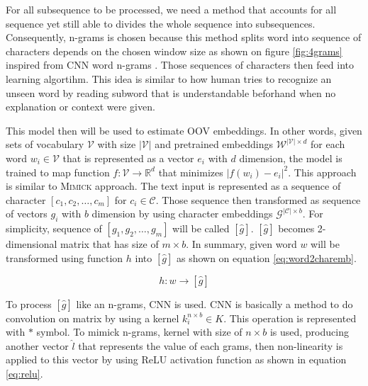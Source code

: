         For all subsequence to be processed, we need a method that
        accounts for all sequence yet still able to divides the whole
        sequence into subsequences. Consequently, n-grams is chosen
        because this method splits word into sequence of characters
        depends on the chosen window size as shown on figure
        \ref{fig:4grams} inspired from CNN word n-grams
        \citep{convolutional2014kim}. Those sequences of characters
        then feed into learning algortihm. This idea is similar to how
        human tries to recognize an unseen word by reading subword
        that is understandable beforhand when no explanation or
        context were given. 

        This model then will be used to estimate OOV embeddings. In
        other words, given sets of vocabulary $\mathcal{V}$ with size
        $\vert\mathcal{V}\vert$ and pretrained embeddings
        $\mathcal{W}^{\vert\mathcal{V}\vert \times d}$ for each word
        $w_{i} \in \mathcal{V}$ that is represented as a vector $e_i$
        with $d$ dimension, the model is trained to map function
        $f:\mathcal{V} \rightarrow \mathbb{R}^d$ that minimizes $\vert
        f(w_i) - e_i
        \vert^{2}$. This approach is similar to \textsc{Mimick}
        \citep{mimicking2017Pinter} approach. The text input is
        represented as a sequence of character $[c_1, c_2, \dots,
        c_m]$ for $c_i \in \mathcal{C}$. Those sequence then
        transformed as sequence of vectors $g_i$ with $b$ dimension by
        using character embeddings $\mathcal{G}^{\vert \mathcal{C}
        \vert \times b}$. For simplicity, sequence of $[g_1, g_2,
        \dots, g_m]$ will be called $[\hat{g}]$. $[\hat{g}]$ becomes
        2-dimensional matrix that has size of $m \times b$. In
        summary, given word $w$ will be transformed using function $h$
        into $[\hat{g}]$ as shown on equation \ref{eq:word2charemb}.

        \begin{equation}
            \label{eq:word2charemb}
            h: w \rightarrow [\hat{g}]
        \end{equation}

        To process $[\hat{g}]$ like an n-grams, CNN is used. CNN is
        basically a method to do convolution on matrix by using a
        kernel $k_i^{n \times b} \in K$. This operation is represented
        with $*$ symbol. To mimick n-grams, kernel with size of $n
        \times b$ is used, producing another vector $\hat{l}$ that
        represents the value of each grams, then non-linearity is
        applied to this vector by using ReLU activation function as
        shown in equation \ref{eq:relu}.

